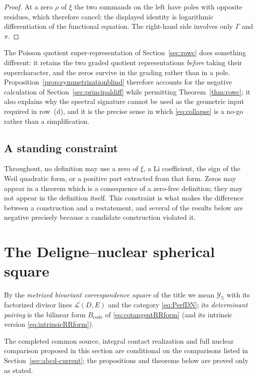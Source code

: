 \documentclass[11pt]{amsart}
\theoremstyle{definition}
\theoremstyle{remark}
\begin{document}
\begin{proof}
At a zero $\rho$ of $\xi$ the two summands on the left have poles with
opposite residues, which therefore cancel; the displayed identity is
logarithmic differentiation of the functional equation.  The right-hand side
involves only $\Gamma$ and $\pi$.
\end{proof}

The Poisson quotient super-representation of Section~\ref{sec:rowc} does
something different: it
retains the two graded quotient representations \emph{before} taking their
supercharacter, and the zeros survive in the grading rather than in a pole.
Proposition~\ref{prop:symmetrizationblind} therefore
accounts for the negative calculation of Section~\ref{sec:principaldiff}
while permitting
Theorem~\ref{thm:rowc}; it also explains why the spectral signature cannot be
used as the geometric input required in row~(d), and it is the precise sense
in which \eqref{eq:collapse} is a no-go rather than a simplification.

\subsection{A standing constraint}
\label{ss:constraint}

Throughout, no definition may use a zero of $\xi$, a Li coefficient, the
sign of the Weil quadratic form, or a positive part extracted from that
form.  Zeros may appear in a theorem which is a consequence of a zero-free
definition; they may not appear in the definition itself.  This constraint
is what makes the difference between a construction and a restatement, and
several of the results below are negative precisely because a candidate
construction violated it.


\section{The Deligne--nuclear spherical square}
\label{sec:geometric-a}
\noindent By the \emph{metrized bivariant correspondence square} of the title we
mean $\mathscr Y_{\mathbb S}$ with its factorized divisor lines
$\mathcal L(D,E)$ and the category \eqref{eq:PerfDN}; its \emph{determinant
pairing} is the bilinear form $B_{\mathrm{code}}$ of
\eqref{eq:cotangentRRform} (and its intrinsic version
\eqref{eq:intrinsicRRform}).

The completed common source, integral contact realization and
full nuclear comparison proposed in this section are conditional on the
comparisons listed in Section~\ref{sec:abcd-current}; the propositions and
theorems below are proved only as stated.
\end{document}
